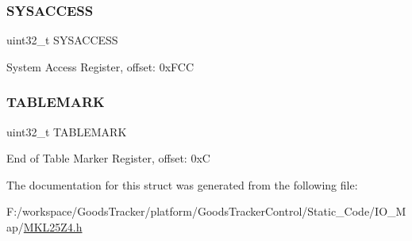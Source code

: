 \subsubsection{\texorpdfstring{S\+Y\+S\+A\+C\+C\+E\+SS}{SYSACCESS}}
{\footnotesize\ttfamily uint32\+\_\+t S\+Y\+S\+A\+C\+C\+E\+SS}

System Access Register, offset\+: 0x\+F\+CC \mbox{\label{struct_r_o_m___mem_map_af2183c9d5dbc69a514ecef0aa2d22ed3}} 
\subsubsection{\texorpdfstring{T\+A\+B\+L\+E\+M\+A\+RK}{TABLEMARK}}
{\footnotesize\ttfamily uint32\+\_\+t T\+A\+B\+L\+E\+M\+A\+RK}

End of Table Marker Register, offset\+: 0xC 

The documentation for this struct was generated from the following file\+:\begin{DoxyCompactItemize}
\item 
F\+:/workspace/\+Goods\+Tracker/platform/\+Goods\+Tracker\+Control/\+Static\+\_\+\+Code/\+I\+O\+\_\+\+Map/\hyperlink{_m_k_l25_z4_8h}{M\+K\+L25\+Z4.\+h}\end{DoxyCompactItemize}
